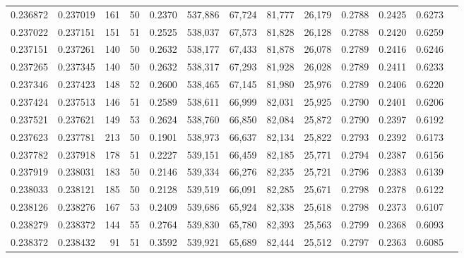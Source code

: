\begin{tabular}{rrrrrrrrrrrrr}
0.236872 & 0.237019 &   161 &  50 &                                     0.2370 & 537,886 &  67,724 &  81,777 &  26,179 & 0.2788 & 0.2425 & 0.6273 \\
0.237022 & 0.237151 &   151 &  51 &                                     0.2525 & 538,037 &  67,573 &  81,828 &  26,128 & 0.2788 & 0.2420 & 0.6259 \\
0.237151 & 0.237261 &   140 &  50 &                                     0.2632 & 538,177 &  67,433 &  81,878 &  26,078 & 0.2789 & 0.2416 & 0.6246 \\
0.237265 & 0.237345 &   140 &  50 &                                     0.2632 & 538,317 &  67,293 &  81,928 &  26,028 & 0.2789 & 0.2411 & 0.6233 \\
0.237346 & 0.237423 &   148 &  52 &                                     0.2600 & 538,465 &  67,145 &  81,980 &  25,976 & 0.2789 & 0.2406 & 0.6220 \\
0.237424 & 0.237513 &   146 &  51 &                                     0.2589 & 538,611 &  66,999 &  82,031 &  25,925 & 0.2790 & 0.2401 & 0.6206 \\
0.237521 & 0.237621 &   149 &  53 &                                     0.2624 & 538,760 &  66,850 &  82,084 &  25,872 & 0.2790 & 0.2397 & 0.6192 \\
0.237623 & 0.237781 &   213 &  50 &                                     0.1901 & 538,973 &  66,637 &  82,134 &  25,822 & 0.2793 & 0.2392 & 0.6173 \\
0.237782 & 0.237918 &   178 &  51 &                                     0.2227 & 539,151 &  66,459 &  82,185 &  25,771 & 0.2794 & 0.2387 & 0.6156 \\
0.237919 & 0.238031 &   183 &  50 &                                     0.2146 & 539,334 &  66,276 &  82,235 &  25,721 & 0.2796 & 0.2383 & 0.6139 \\
0.238033 & 0.238121 &   185 &  50 &                                     0.2128 & 539,519 &  66,091 &  82,285 &  25,671 & 0.2798 & 0.2378 & 0.6122 \\
0.238126 & 0.238276 &   167 &  53 &                                     0.2409 & 539,686 &  65,924 &  82,338 &  25,618 & 0.2798 & 0.2373 & 0.6107 \\
0.238279 & 0.238372 &   144 &  55 &                                     0.2764 & 539,830 &  65,780 &  82,393 &  25,563 & 0.2799 & 0.2368 & 0.6093 \\
0.238372 & 0.238432 &    91 &  51 &                                     0.3592 & 539,921 &  65,689 &  82,444 &  25,512 & 0.2797 & 0.2363 & 0.6085 \\

\end{tabular}
